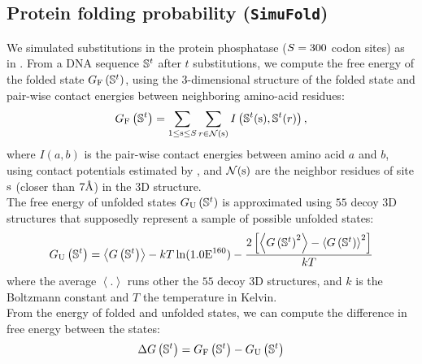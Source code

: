 \subsection{Protein folding probability (\texttt{SimuFold})}
\label{subsec:protein-folding-probability}

We simulated substitutions in the protein phosphatase ($S=300$ codon sites) as in \citet{Goldstein2017}.
From a \acrshort{DNA} sequence $\mathbb{S}^t$ after $t$ substitutions, we compute the free energy of the folded state $ G_{\text{F}} \left(\mathbb{S}^{t}\right)$, using the 3-dimensional structure of the folded state and pair-wise contact energies between neighboring amino-acid residues:
\begin{equation}
    G_{\text{F}} \left(\mathbb{S}^{t}\right) = \sum\limits_{1 \leq \text{s} \leq S} \sum\limits_{r \in \mathcal{N}(\text{s})} I \left(\mathbb{S}^t(\text{s}), \mathbb{S}^t(r) \right),
\end{equation}
where $I(a,b)$ is the pair-wise contact energies between amino acid $a$ and $b$, using contact potentials estimated by \citet{Miyazawa1985}, and $\mathcal{N}(\text{s})$ are the neighbor residues of site $\text{s}$ (closer than $7\text{\normalfont\AA}$) in the 3D structure.\\

The free energy of unfolded states $G_{\text{U}} \left(\mathbb{S}^{t}\right)$ is approximated using $55$ decoy 3D structures that supposedly represent a sample of possible unfolded states:
\begin{equation}
    G_{\text{U}} \left(\mathbb{S}^{t}\right) = \left\langle G\left(\mathbb{S}^{t}\right) \right\rangle - kT \ln (1.0\text{E}^{160}) - \dfrac{2 \left[ \left\langle G\left(\mathbb{S}^{t}\right)^2 \right\rangle - \left\langle G\left(\mathbb{S}^{t}\right) \right\rangle^2\right] }{kT}
\end{equation}
where the average $\left\langle . \right\rangle$ runs other the $55$ decoy 3D structures, and $k$ is the Boltzmann constant and $T$ the temperature in Kelvin.\\

From the energy of folded and unfolded states, we can compute the difference in free energy between the states:
\begin{equation}
    \Delta G\left(\mathbb{S}^{t}\right) = G_{\text{F}} \left(\mathbb{S}^{t}\right) - G_{\text{U}} \left(\mathbb{S}^{t}\right)
\end{equation}

